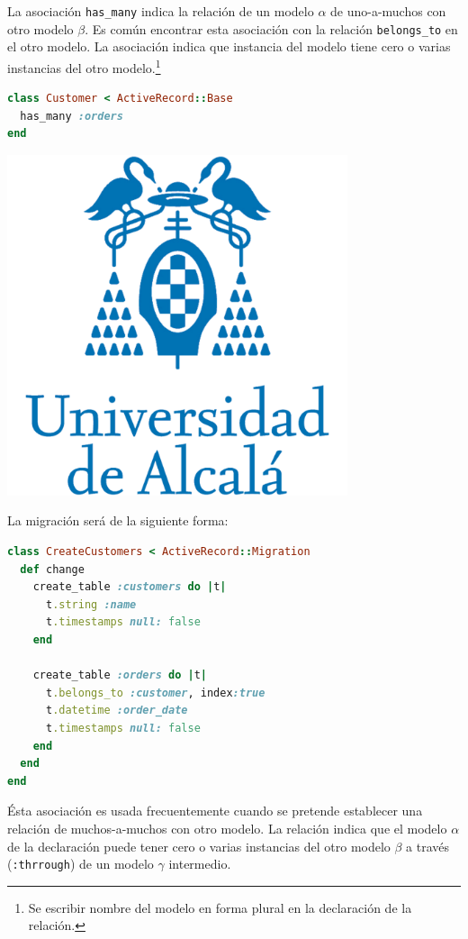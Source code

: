 La asociación \texttt{has\_many} indica la relación de un modelo $\alpha$ de uno-a-muchos con otro modelo $\beta$. Es común encontrar esta asociación con la relación \texttt{belongs\_to} en el otro modelo. La asociación indica que instancia del modelo tiene cero o varias instancias del otro modelo.\footnote{Se escribir nombre del modelo en forma plural en la declaración de la relación. }

\begin{lstlisting}[language=Ruby]
class Customer < ActiveRecord::Base
  has_many :orders
end
\end{lstlisting}

\includegraphics[width=10cm]{./image/logos/uahlogo3.png}

La migración será de la siguiente forma:

\begin{lstlisting}[language=Ruby]
class CreateCustomers < ActiveRecord::Migration
  def change
    create_table :customers do |t|
      t.string :name
      t.timestamps null: false
    end
 
    create_table :orders do |t|
      t.belongs_to :customer, index:true
      t.datetime :order_date
      t.timestamps null: false
    end
  end
end
\end{lstlisting}


Ésta asociación es usada frecuentemente cuando se pretende establecer una relación de muchos-a-muchos con otro modelo. La relación indica que el modelo $\alpha$ de la declaración puede tener cero o varias instancias del otro modelo $\beta$ a través (\texttt{:thrrough}) de un modelo $\gamma$ intermedio.

